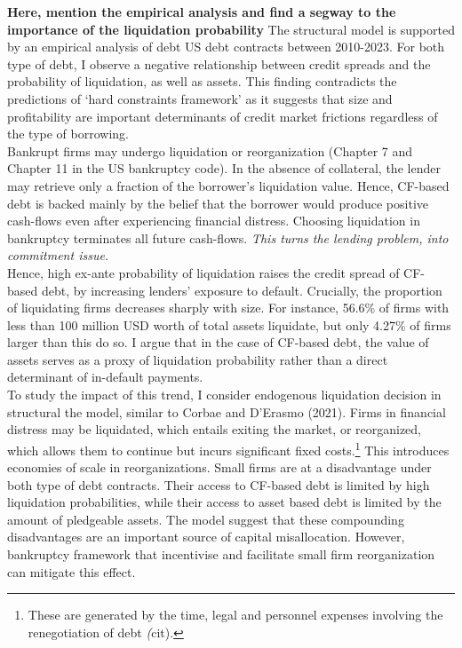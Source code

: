 \documentclass[12pt]{article}
\begin{document}
\textbf{Here, mention the empirical analysis and find a segway to the importance of the liquidation probability} The structural model is supported by an empirical analysis of debt US debt contracts between 2010-2023. For both type of debt, I observe a negative relationship between credit spreads and the probability of liquidation, as well as assets. This finding contradicts the predictions of `hard constraints framework' as it suggests that size and profitability are important determinants of credit market frictions regardless of the type of borrowing. \vspace{3mm} \\
Bankrupt firms may undergo liquidation or reorganization (Chapter 7 and Chapter 11 in the US bankruptcy code). In the absence of collateral, the lender may retrieve only a fraction of the borrower's liquidation value. Hence, CF-based debt is backed mainly by the belief that the borrower would produce positive cash-flows even after experiencing financial distress. Choosing liquidation in bankruptcy terminates all future cash-flows. \textit{This turns the lending problem, into commitment issue.} \vspace{3mm} \\
Hence, high ex-ante probability of liquidation raises the credit spread of CF-based debt, by increasing lenders' exposure to default. Crucially, the proportion of liquidating firms decreases sharply with size. For instance, 56.6\% of firms with less than 100 million USD worth of total assets liquidate, but only 4.27\% of firms larger than this do so. I argue that in the case of CF-based debt, the value of assets serves as a proxy of liquidation probability rather than a direct determinant of in-default payments. \vspace*{3mm} \\ 
To study the impact of this trend, I consider endogenous liquidation decision in structural the model, similar to Corbae and D'Erasmo (2021). Firms in financial distress may  be liquidated, which entails exiting the market, or reorganized, which allows them to continue but incurs significant fixed costs.\footnote{These are generated by the time, legal and personnel expenses involving the renegotiation of debt \textit(cit).} This introduces economies of scale in reorganizations. Small firms are at a disadvantage under both type of debt contracts. Their access to CF-based debt is limited by high liquidation probabilities, while their access to asset based debt is limited by the amount of pledgeable assets. The model suggest that these compounding disadvantages are an important source of capital misallocation. However, bankruptcy framework that incentivise and facilitate small firm reorganization can mitigate this effect. \vspace*{3mm} \\
\end{document}
